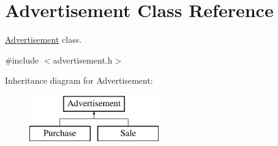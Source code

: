 \hypertarget{class_advertisement}{}\section{Advertisement Class Reference}
\label{class_advertisement}


\hyperlink{class_advertisement}{Advertisement} class.  




{\ttfamily \#include $<$advertisement.\+h$>$}

Inheritance diagram for Advertisement\+:\begin{figure}[H]
\begin{center}
\leavevmode
\includegraphics[height=2.000000cm]{class_advertisement}
\end{center}
\end{figure}
